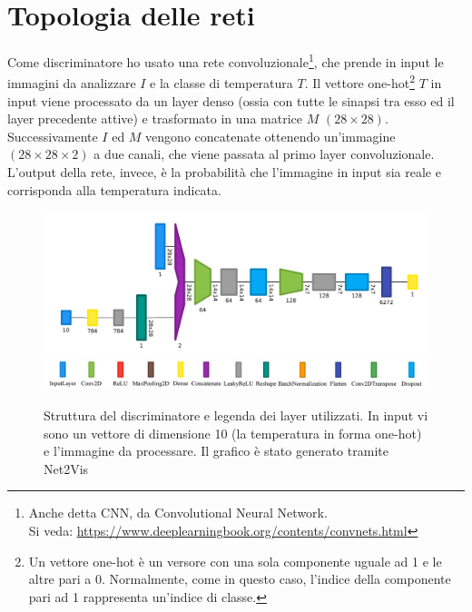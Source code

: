 \documentclass[Lau, noexaminfo, oneside]{sapthesis} %
\begin{document}
\section{Topologia delle reti}
Come discriminatore ho usato una rete convoluzionale\footnote{Anche detta CNN, da Convolutional Neural Network.\\ Si veda: \url{https://www.deeplearningbook.org/contents/convnets.html}}, che prende in input le immagini da analizzare $I$ e la classe di temperatura $T$. Il vettore one-hot\footnote{Un vettore one-hot è un versore con una sola componente uguale ad 1 e le altre pari a 0. Normalmente, come in questo caso, l'indice della componente pari ad 1 rappresenta un'indice di classe.} $T$ in input viene processato da un layer denso (ossia con tutte le sinapsi tra esso ed il layer precedente attive) e trasformato in una matrice $M$ $(28\times28)$. Successivamente $I$ ed $M$ vengono concatenate ottenendo un'immagine $(28\times28\times2)$ a due canali, che viene passata al primo layer convoluzionale. L'output della rete, invece, è la probabilità che l'immagine in input sia reale e corrisponda alla temperatura indicata.
\begin{figure}[H]
\includegraphics[width=\textwidth]{dis.png}\\
\includegraphics[width=\textwidth]{legend.jpg}
\centering
\caption[...]{Struttura del discriminatore e legenda dei layer utilizzati\protect\footnotemark. In input vi sono un vettore di dimensione 10 (la temperatura in forma one-hot) e l'immagine da processare. Il grafico è stato generato tramite Net2Vis \cite{net2vis}}
\end{figure}
\end{document}
